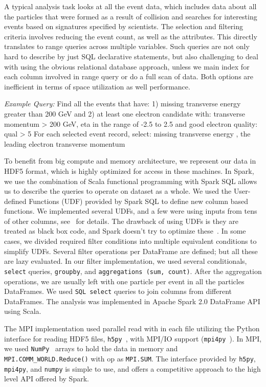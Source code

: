 \documentclass[11pt, twocolumn]{article}
\begin{document}
A typical analysis task looks at all the event data, which includes data about 
all the particles that were formed as a result of collision and searches for 
interesting events based on signatures specified by scientists. 
The selection and filtering criteria involves reducing the event count, 
as well as the attributes. This directly translates to range queries 
across multiple variables. Such queries are not only hard to 
describe by just SQL declarative statements, but also 
challenging to deal with using the obvious relational database approach, 
unless we main index for each column involved in range query or do a 
full scan of data. Both options are inefficient in terms of space utilization 
as well performance. 

\textit{Example Query:} Find all the events that have:
1) missing transverse energy greater than 200 GeV and 
2) at least one electron candidate with: transverse momentum > 200 GeV, eta in the range of -2.5 to 2.5
and good electron quality: qual > 5
For each selected event record, select: missing transverse energy , the leading electron transverse momentum

To benefit from big compute and memory architecture, we represent our data 
in HDF5 format, which is highly optimized for access in these machines. 
In Spark, we use the combination of Scala functional programming with Spark SQL 
allows us to describe the queries to operate on dataset as a whole. 
We used the User-defined Functions (UDF) provided by Spark SQL to define new column based 
functions. We implemented several UDFs, and a few were using inputs from tens of 
other columns, see~\cite{spark-hdf5-cms} for details. The drawback of using UDFs is they are treated as black box code, 
and Spark doesn't try to optimize these~\cite{spark-notes}. In some cases, we divided required filter conditions 
into multiple equivalent conditions to simplify UDFs. 
Several filter operations per DataFrame are defined; but all these are lazy evaluated. 
In our filter implementation, we used several conditionals, 
\texttt{select} queries, \texttt{groupby}, and \texttt{aggregations (sum, count)}. 
After the aggregation operations, we are usually left with one particle per event in 
all the particles DataFrames. 
We used \texttt{SQL select} queries to join columns from different DataFrames.
The analysis was implemented in Apache Spark 2.0 DataFrame API using Scala.  

The MPI implementation used parallel read with in each file utilizing the Python interface 
for reading HDF5 files, \texttt{h5py}~\cite{h5py}, with MPI/IO support (\texttt{mpi4py}~\cite{mpi4py}). 
In MPI, we used \texttt{NumPy}~\cite{numpy} arrays to hold the data in memory and 
\texttt{MPI.COMM\_WORLD.Reduce()} with op as \texttt{MPI.SUM}. 
The interface provided by \texttt{h5py}, \texttt{mpi4py}, and \texttt{numpy} 
is simple to use, and offers a competitive approach to the high level API offered by Spark. 
\end{document}
